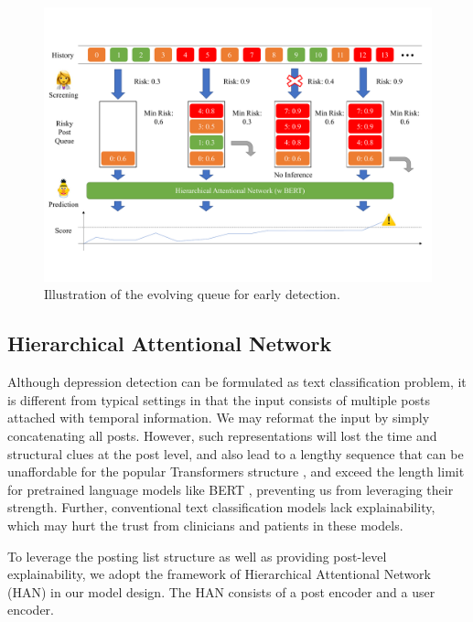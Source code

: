\begin{figure}[htbp]
    \centering
    \includegraphics[width=1.8\columnwidth]{figures/evolving.pdf}
    \caption{Illustration of the evolving queue for early detection.}
    \label{fig:evolving}
\end{figure}

\subsection{Hierarchical Attentional Network}
\label{sec:HAN}

Although depression detection can be formulated as text classification problem, it is different from typical settings in that the input consists of multiple posts attached with temporal information. We may reformat the input by simply concatenating all posts. However, such representations will lost the time and structural clues at the post level, and also lead to a lengthy sequence that can be unaffordable for the popular Transformers structure \citep{vaswani2017attention}, and exceed the length limit for pretrained language models like BERT \citep{devlin2018bert}, preventing us from leveraging their strength. Further, conventional text classification models lack explainability, which may hurt the trust from clinicians and patients in these models. 

To leverage the posting list structure as well as providing post-level explainability, we adopt the framework of Hierarchical Attentional Network (HAN) \citep{yang2016hierarchical} in our model design. The HAN consists of a post encoder and a user encoder. 


